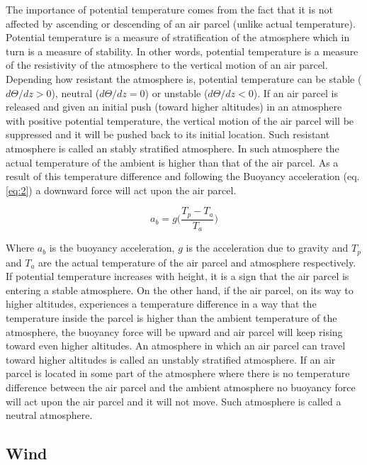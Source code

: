 \documentclass[a4paper,12pt]{article}
\numberwithin{equation}{section} %
\begin{document}
The importance of potential temperature comes from the fact that it is not affected by ascending or descending of an air parcel (unlike actual temperature). Potential temperature is a measure of stratification of the atmosphere which in turn is a measure of stability. In other words, potential temperature is a measure of the resistivity of the atmosphere to the vertical motion of an air parcel. Depending how resistant the atmosphere is, potential temperature can be stable ($d\Theta/dz > 0$), neutral ($d\Theta/dz = 0$) or unstable ($d\Theta/dz < 0$). If an air parcel is released and given an initial push (toward higher altitudes) in an atmosphere with positive potential temperature, the vertical motion of the air parcel will be suppressed and it will be pushed back to its initial location. Such resistant atmosphere is called an stably stratified atmosphere. In such atmosphere the actual temperature of the ambient is higher than that of the air parcel. As a result of this temperature difference and following the Buoyancy acceleration (eq. \ref{eq:2}) a downward force will act upon the air parcel.

\vspace{0.5cm}
\begin{equation}\label{eq:2}
a_b = g\bigg(\frac{T_p - T_a}{T_a}\bigg)
\end{equation}

\vspace{0.25cm}

Where $a_b$ is the buoyancy acceleration, $g$ is the acceleration due to gravity and $T_p$ and $T_a$ are the actual temperature of the air parcel and atmosphere respectively. If potential temperature increases with height, it is a sign that the air parcel is entering a stable atmosphere. On the other hand, if the air parcel, on its way to higher altitudes, experiences a temperature difference in a way that the temperature inside the parcel is higher than the ambient temperature of the atmosphere, the buoyancy force will be upward and air parcel will keep rising toward even higher altitudes. An atmosphere in which an air parcel can travel toward higher altitudes is called an unstably stratified atmosphere. If an air parcel is located in some part of the atmosphere where there is no temperature difference between the air parcel and the ambient atmosphere no buoyancy force will act upon the air parcel and it will not move. Such atmosphere is called a neutral atmosphere.

\subsection{Wind}
\end{document}
